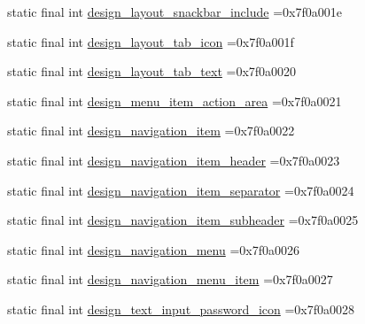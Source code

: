 \begin{DoxyCompactItemize}
\item 
static final int \mbox{\hyperlink{classbr_1_1unb_1_1cic_1_1mp_1_1marketmaster_1_1test_1_1R_1_1layout_a79de27a1342763bc9707e8b72f6080d8}{design\+\_\+layout\+\_\+snackbar\+\_\+include}} =0x7f0a001e
\item 
static final int \mbox{\hyperlink{classbr_1_1unb_1_1cic_1_1mp_1_1marketmaster_1_1test_1_1R_1_1layout_ad8ca4ae1a7a153aab5d7782ceffefac8}{design\+\_\+layout\+\_\+tab\+\_\+icon}} =0x7f0a001f
\item 
static final int \mbox{\hyperlink{classbr_1_1unb_1_1cic_1_1mp_1_1marketmaster_1_1test_1_1R_1_1layout_a6a8c728a8bcf30159e5ddb1e4fb27ee9}{design\+\_\+layout\+\_\+tab\+\_\+text}} =0x7f0a0020
\item 
static final int \mbox{\hyperlink{classbr_1_1unb_1_1cic_1_1mp_1_1marketmaster_1_1test_1_1R_1_1layout_a9dbb1d43a07faecce1e6214d4a714e12}{design\+\_\+menu\+\_\+item\+\_\+action\+\_\+area}} =0x7f0a0021
\item 
static final int \mbox{\hyperlink{classbr_1_1unb_1_1cic_1_1mp_1_1marketmaster_1_1test_1_1R_1_1layout_a3aed04d960d14344feede499bc6dc43b}{design\+\_\+navigation\+\_\+item}} =0x7f0a0022
\item 
static final int \mbox{\hyperlink{classbr_1_1unb_1_1cic_1_1mp_1_1marketmaster_1_1test_1_1R_1_1layout_a2dac74c16800b30e0ff2896bd6adcea6}{design\+\_\+navigation\+\_\+item\+\_\+header}} =0x7f0a0023
\item 
static final int \mbox{\hyperlink{classbr_1_1unb_1_1cic_1_1mp_1_1marketmaster_1_1test_1_1R_1_1layout_a178ccd865c3cd6a94f1cb46111c05090}{design\+\_\+navigation\+\_\+item\+\_\+separator}} =0x7f0a0024
\item 
static final int \mbox{\hyperlink{classbr_1_1unb_1_1cic_1_1mp_1_1marketmaster_1_1test_1_1R_1_1layout_a86892600f6c485d708fccc8a2f82743f}{design\+\_\+navigation\+\_\+item\+\_\+subheader}} =0x7f0a0025
\item 
static final int \mbox{\hyperlink{classbr_1_1unb_1_1cic_1_1mp_1_1marketmaster_1_1test_1_1R_1_1layout_a24fea19594acf34f18a531d5a76f88e6}{design\+\_\+navigation\+\_\+menu}} =0x7f0a0026
\item 
static final int \mbox{\hyperlink{classbr_1_1unb_1_1cic_1_1mp_1_1marketmaster_1_1test_1_1R_1_1layout_ae972edab9d86933f4cb344396ed5cc4e}{design\+\_\+navigation\+\_\+menu\+\_\+item}} =0x7f0a0027
\item 
static final int \mbox{\hyperlink{classbr_1_1unb_1_1cic_1_1mp_1_1marketmaster_1_1test_1_1R_1_1layout_ad6e204088c0ff21648d92f769d0bba25}{design\+\_\+text\+\_\+input\+\_\+password\+\_\+icon}} =0x7f0a0028

\end{DoxyCompactItemize}
